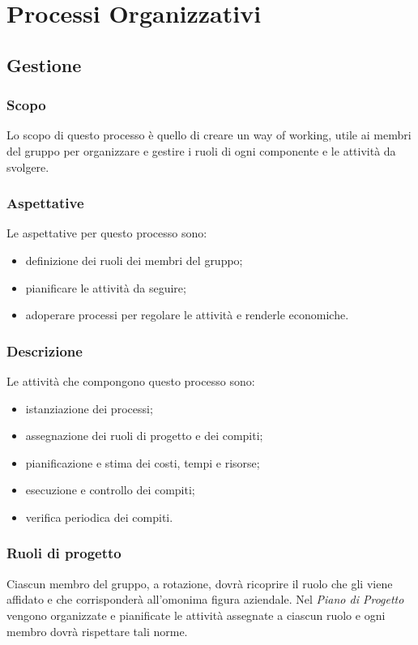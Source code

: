 \section{Processi Organizzativi}
	\subsection{Gestione}
		\subsubsection{Scopo}
			Lo scopo di questo processo è quello di creare un way of working, utile ai membri del gruppo per organizzare e gestire i ruoli di ogni componente e le attività da svolgere.
  		\subsubsection{Aspettative}
  			Le aspettative per questo processo sono:
  			\begin{itemize}
  				\item definizione dei ruoli dei membri del gruppo;
  				\item pianificare le attività da seguire;
  				\item adoperare processi per regolare le attività e renderle economiche.
			\end{itemize}
   		\subsubsection{Descrizione}
   			Le attività che compongono questo processo sono:
   			\begin{itemize}
   				\item istanziazione dei processi;
   				\item assegnazione dei ruoli di progetto e dei compiti;
   				\item pianificazione e stima dei costi, tempi e risorse;
	   			\item esecuzione e controllo dei compiti;
   				\item verifica periodica dei compiti.
		   	\end{itemize}
   		\subsubsection{Ruoli di progetto}
   			Ciascun membro del gruppo, a rotazione, dovrà ricoprire il ruolo che gli viene affidato e che corrisponderà all'omonima figura aziendale. Nel \textit{Piano di Progetto} vengono organizzate e pianificate le attività assegnate a ciascun ruolo e ogni membro dovrà rispettare tali norme.
   			
